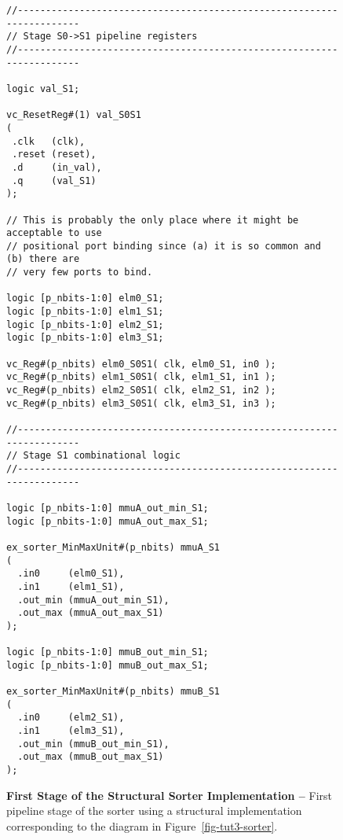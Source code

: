 
\begin{figure}

\begin{lstlisting}
//----------------------------------------------------------------------
// Stage S0->S1 pipeline registers
//----------------------------------------------------------------------

logic val_S1;

vc_ResetReg#(1) val_S0S1
(
 .clk   (clk),
 .reset (reset),
 .d     (in_val),
 .q     (val_S1)
);

// This is probably the only place where it might be acceptable to use
// positional port binding since (a) it is so common and (b) there are
// very few ports to bind.

logic [p_nbits-1:0] elm0_S1;
logic [p_nbits-1:0] elm1_S1;
logic [p_nbits-1:0] elm2_S1;
logic [p_nbits-1:0] elm3_S1;

vc_Reg#(p_nbits) elm0_S0S1( clk, elm0_S1, in0 );
vc_Reg#(p_nbits) elm1_S0S1( clk, elm1_S1, in1 );
vc_Reg#(p_nbits) elm2_S0S1( clk, elm2_S1, in2 );
vc_Reg#(p_nbits) elm3_S0S1( clk, elm3_S1, in3 );

//----------------------------------------------------------------------
// Stage S1 combinational logic
//----------------------------------------------------------------------

logic [p_nbits-1:0] mmuA_out_min_S1;
logic [p_nbits-1:0] mmuA_out_max_S1;

ex_sorter_MinMaxUnit#(p_nbits) mmuA_S1
(
  .in0     (elm0_S1),
  .in1     (elm1_S1),
  .out_min (mmuA_out_min_S1),
  .out_max (mmuA_out_max_S1)
);

logic [p_nbits-1:0] mmuB_out_min_S1;
logic [p_nbits-1:0] mmuB_out_max_S1;

ex_sorter_MinMaxUnit#(p_nbits) mmuB_S1
(
  .in0     (elm2_S1),
  .in1     (elm3_S1),
  .out_min (mmuB_out_min_S1),
  .out_max (mmuB_out_max_S1)
);
\end{lstlisting}

  \caption{\textbf{First Stage of the Structural Sorter Implementation
      --} First pipeline stage of the sorter using a structural
    implementation corresponding to the diagram in
    Figure~\ref{fig-tut3-sorter}.}
  \label{code-tut3-sorter-struct}

\end{figure}

